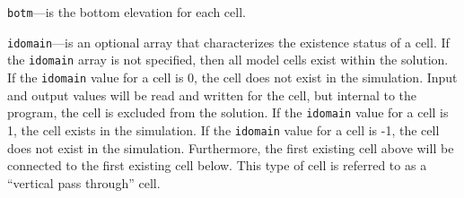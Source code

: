 \item \texttt{botm}---is the bottom elevation for each cell.

\item \texttt{idomain}---is an optional array that characterizes the existence status of a cell.  If the \texttt{idomain} array is not specified, then all model cells exist within the solution.  If the \texttt{idomain} value for a cell is 0, the cell does not exist in the simulation.  Input and output values will be read and written for the cell, but internal to the program, the cell is excluded from the solution.  If the \texttt{idomain} value for a cell is 1, the cell exists in the simulation.  If the \texttt{idomain} value for a cell is -1, the cell does not exist in the simulation.  Furthermore, the first existing cell above will be connected to the first existing cell below.  This type of cell is referred to as a ``vertical pass through'' cell.



